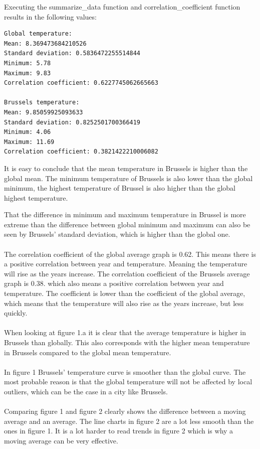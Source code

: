 \documentclass{article}
\begin{document}
Executing the summarize\_data function and correlation\_coefficient function results in the following values:

\begin{verbatim}
Global temperature:
Mean: 8.369473684210526
Standard deviation: 0.5836472255514844
Minimum: 5.78
Maximum: 9.83
Correlation coefficient: 0.6227745062665663

Brussels temperature:
Mean: 9.85059925093633
Standard deviation: 0.8252501700366419
Minimum: 4.06
Maximum: 11.69
Correlation coefficient: 0.3821422210006082
\end{verbatim}


It is easy to conclude that the mean temperature in Brussels is higher than the global mean. The minimum temperature of Brussels is also lower than the global minimum, the highest temperature of Brussel is also higher than the global highest temperature. 

That the difference in minimum and maximum temperature in Brussel is more extreme than the difference between global minimum and maximum can also be seen by Brussels' standard deviation, which is higher than the global one.

\paragraph{}
The correlation coefficient of the global average graph is 0.62. This means there is a positive correlation between year and temperature. Meaning the temperature will rise as the years increase.
The correlation coefficient of the Brussels average graph is 0.38. which also means a positive correlation between year and temperature. The coefficient is lower than the coefficient of the global average, which means that the temperature will also rise as the years increase, but less quickly.

\paragraph{}
When looking at figure 1.a it is clear that the average temperature is higher in Brussels than globally. This also corresponds with the higher mean temperature in Brussels compared to the global mean temperature.

\paragraph{}
In figure 1 Brussels' temperature curve is smoother than the global curve.  The most probable reason is that the global temperature will not be affected by local outliers, which can be the case in a city like Brussels. 

\paragraph{}
Comparing figure 1 and figure 2 clearly  shows the difference between a moving average and an average. The line charts in figure 2 are a lot less smooth than the ones in figure 1. It is a lot harder to read trends in figure 2 which is why a moving average can be very effective.
\end{document}
